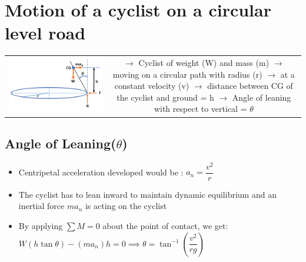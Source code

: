 \documentclass[8pt]{report}
\begin{document}
\section{Motion of a cyclist on a circular level road}
	\begin{table}[H]
		\centering
		\begin{tabular}{cc}
			\parbox{9cm}{\includegraphics[scale=0.5]{cyclist_circular.png}} & 
			\parbox{12cm}{$\rightarrow$ Cyclist of weight (W) and mass (m)\\\\$\rightarrow$ moving on a circular path with radius (r)\\\\$\rightarrow$ at a constant velocity (v)\\\\$\rightarrow$ distance between CG of the cyclist and ground = h\\\\$\rightarrow$ Angle of leaning with respect to vertical = $\theta$}
		\end{tabular}
	\end{table}
	\subsection{Angle of Leaning($\theta$)}
		\begin{itemize}
			\item Centripetal acceleration developed would be : $a_n = \dfrac{v^2}{r}$
			\item The cyclist has to lean inward to maintain dynamic equilibrium and an inertial force $ma_n$ is acting on the cyclist
			\item By applying $\sum M=0$ about the point of contact, we get: $W(h\tan\theta)-(ma_n)h=0 \implies \boxed{\theta=\tan^{-1}\left(\dfrac{v^2}{rg}\right)}$ 
		\end{itemize}
\end{document}
